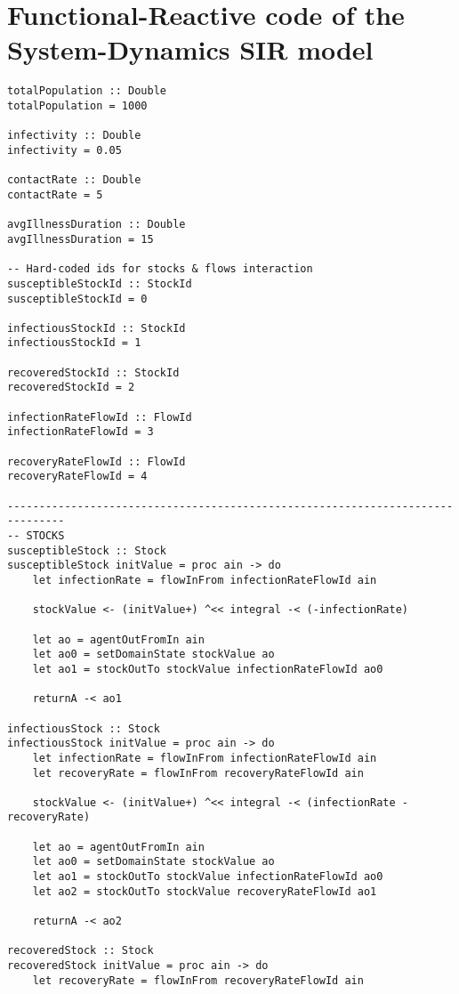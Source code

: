 \section{Functional-Reactive code of the System-Dynamics SIR model}
\label{app:sd_code}

\begin{verbatim}
totalPopulation :: Double
totalPopulation = 1000

infectivity :: Double
infectivity = 0.05

contactRate :: Double
contactRate = 5

avgIllnessDuration :: Double
avgIllnessDuration = 15

-- Hard-coded ids for stocks & flows interaction
susceptibleStockId :: StockId
susceptibleStockId = 0

infectiousStockId :: StockId
infectiousStockId = 1

recoveredStockId :: StockId
recoveredStockId = 2

infectionRateFlowId :: FlowId
infectionRateFlowId = 3

recoveryRateFlowId :: FlowId
recoveryRateFlowId = 4

-------------------------------------------------------------------------------
-- STOCKS
susceptibleStock :: Stock
susceptibleStock initValue = proc ain -> do
    let infectionRate = flowInFrom infectionRateFlowId ain

    stockValue <- (initValue+) ^<< integral -< (-infectionRate)
    
    let ao = agentOutFromIn ain
    let ao0 = setDomainState stockValue ao
    let ao1 = stockOutTo stockValue infectionRateFlowId ao0

    returnA -< ao1

infectiousStock :: Stock
infectiousStock initValue = proc ain -> do
    let infectionRate = flowInFrom infectionRateFlowId ain
    let recoveryRate = flowInFrom recoveryRateFlowId ain

    stockValue <- (initValue+) ^<< integral -< (infectionRate - recoveryRate)
    
    let ao = agentOutFromIn ain
    let ao0 = setDomainState stockValue ao
    let ao1 = stockOutTo stockValue infectionRateFlowId ao0 
    let ao2 = stockOutTo stockValue recoveryRateFlowId ao1
    
    returnA -< ao2

recoveredStock :: Stock
recoveredStock initValue = proc ain -> do
    let recoveryRate = flowInFrom recoveryRateFlowId ain


\end{verbatim}
